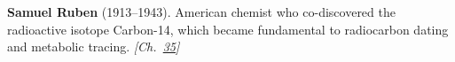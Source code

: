 \textbf{Samuel Ruben} (1913–1943). American chemist who co-discovered the radioactive isotope Carbon-14, which became fundamental to radiocarbon dating and metabolic tracing. \emph{[Ch.~\hyperref[ch:treesfromair]{35}]}

